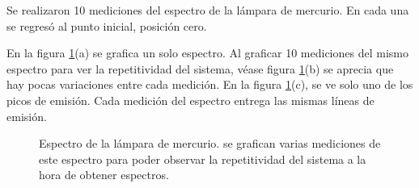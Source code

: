 Se realizaron 10 mediciones del espectro de la lámpara de mercurio. En cada una se regresó al punto inicial, posición cero. 

%

En la figura \ref{fig:medi1}(a) se grafica un solo espectro. Al graficar 10 mediciones del mismo espectro para ver la repetitividad del sistema, véase figura \ref{fig:medi1}(b) se aprecia que hay pocas variaciones entre cada medición. En la figura \ref{fig:medi1}(c), se ve solo uno de los picos de emisión. Cada medición del espectro entrega las mismas líneas de emisión. 

\begin{figure}[h]
	\centering
	
	\caption[Espectro de la lámpara de mercurio. Se aprecia la repetitividad del sistema.]{Espectro de la lámpara de mercurio. se grafican varias mediciones de este espectro para poder observar la repetitividad del sistema a la hora de obtener espectros.}
	\label{fig:medi1}
\end{figure}
